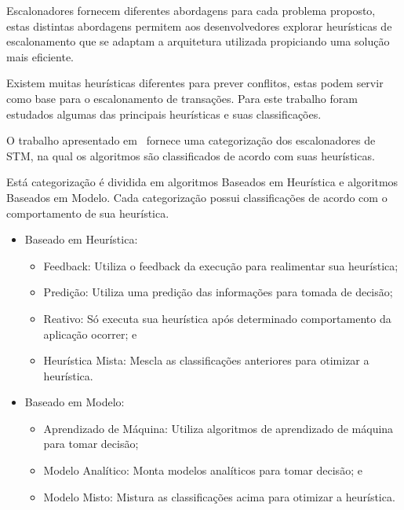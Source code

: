 \documentclass[diss,capa]{texufpel}
\begin{document}

Escalonadores fornecem diferentes abordagens para cada problema proposto, estas distintas abordagens permitem aos desenvolvedores explorar heurísticas de escalonamento que se adaptam a arquitetura utilizada propiciando uma solução mais eficiente.

Existem muitas heurísticas diferentes para prever conflitos, estas podem servir como base para o escalonamento de transações. Para este trabalho foram estudados algumas das principais heurísticas e suas classificações.

O trabalho apresentado em~\cite{disanzo2017} fornece uma categorização dos escalonadores de STM, na qual os algoritmos são classificados de acordo com suas heurísticas.

Está categorização é dividida em algoritmos Baseados em Heurística e algoritmos Baseados em Modelo. Cada categorização possui classificações de acordo com o comportamento de sua heurística.

\begin{itemize}
	\item Baseado em Heurística:
	\begin{itemize}
	    \item Feedback: Utiliza o feedback da execução para realimentar sua heurística;
	    \item Predição: Utiliza uma predição das informações para tomada de decisão;
	    \item Reativo: Só executa sua heurística após determinado comportamento da aplicação ocorrer; e
	    \item Heurística Mista: Mescla as classificações anteriores para otimizar a heurística.
	\end{itemize}
	\item Baseado em Modelo:
	\begin{itemize}
	    \item Aprendizado de Máquina: Utiliza algoritmos de aprendizado de máquina para tomar decisão;
	    \item Modelo Analítico: Monta modelos analíticos para tomar decisão; e
	    \item Modelo Misto: Mistura as classificações acima para otimizar a heurística.
	\end{itemize}
\end{itemize}
\end{document}
